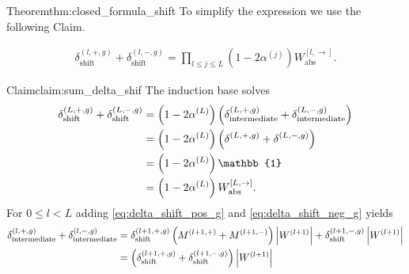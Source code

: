 \begin{proofref}{Theorem}{thm:closed_formula_shift}
    To simplify the expression we use the following Claim.
    \begin{claim} \label{claim:sum_delta_shif}
        \begin{align}
            \delta_{\text{shift}}^{(l,+,g)} + \delta_{\text{shift}}^{(l,-,g)}
                = \prod_{l \leq j \leq L} \left( 1 - 2 \alpha^{(j)} \right) W_{\text{abs}}^{[l, \rightarrow]}.
        \end{align}
    \end{claim}

    \begin{proofref}{Claim}{claim:sum_delta_shif}
        The induction base solves
        \begin{align}
            \delta_{\text{shift}}^{(L,+,g)} + \delta_{\text{shift}}^{(L,-,g)}
                &= \left( 1 - 2 \alpha^{(L)} \right) \left( \delta_{\text{intermediate}}^{(L,+,g)} + \delta_{\text{intermediate}}^{(L,-,g)} \right) \notag\\
                &= \left( 1 - 2 \alpha^{(L)} \right) \left( \delta^{(L,+,g)} + \delta^{(L,-,g)} \right) \notag\\
                &= \left( 1 - 2 \alpha^{(L)} \right) \mathbb{1} \notag\\
                &= \left( 1 - 2 \alpha^{(L)} \right) W_{\text{abs}}^{[L,\rightarrow]}.
        \end{align}
        For $0 \leq l < L$ adding \cref{eq:delta_shift_pos_g} and \cref{eq:delta_shift_neg_g} yields
        \begin{align}
            \delta_{\text{intermediate}}^{(l,+,g)} + \delta_{\text{intermediate}}^{(l,-,g)}
                &= \delta_{\text{shift}}^{(l+1,+,g)} \left( M^{(l+1, +)} + M^{(l+1, -)} \right) \left|W^{(l+1)}\right| + \delta_{\text{shift}}^{(l+1,-,g)} \left|W^{(l+1)}\right| \notag\\
                &= \left( \delta_{\text{shift}}^{(l+1,+,g)} + \delta_{\text{shift}}^{(l+1,-,g)} \right) \left|W^{(l+1)}\right| \label{eq:sum_shifted}
        \end{align}
        

\end{proofref}
\end{proofref}
